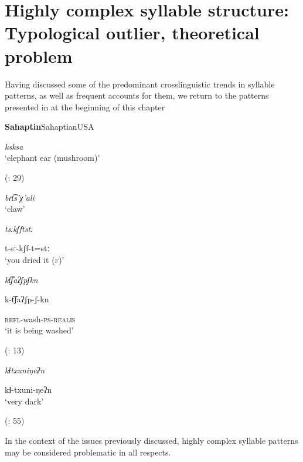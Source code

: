 \section{Highly complex syllable structure: Typological outlier, theoretical problem}\label{sec:1.2}

  Having discussed some of the predominant crosslinguistic trends in syllable patterns, as well as frequent accounts for them, we return to the patterns presented in at the beginning of this chapter 

\ea\label{ex:1.8}
 \textbf{Sahaptin}{Sahaptian}{USA}

\textit{ksksa}\\
\glt ‘elephant ear (mushroom)’

(\citealt{HargusBeavert2006}: 29)
\z

\ea\label{ex:1.9}

\textit{bɾt͡s’χ’ali}\\
\glt ‘claw’
\citep[204]{Butskhrikidze2002}
\z

\ea\label{ex:1.10}

\textit{tsːkʃftstː}

t-sː-kʃf-t=stː\\
\glt ‘you dried it (\textsc{f})’
\citep[332]{Ridouane2008}
\z

\ea\label{ex:1.11}

\textit{kt͡ʃaʔʃpʃkn}

k-t͡ʃaʔʃp-ʃ-kn

\textsc{refl}-wash-\textsc{ps-realis}\\
\glt ‘it is being washed’

(\citealt{FernándezGarayHernández2006}: 13)
\z

\ea\label{ex:1.12}

\textit{kɬtxuniŋeʔn}

kɬ-txuni-ŋeʔn\\
\glt ‘very dark’

(\citealt{GeorgVolodin1999}: 55)
\z

In the context of the issues previously discussed, highly complex syllable patterns may be considered problematic in all respects.

